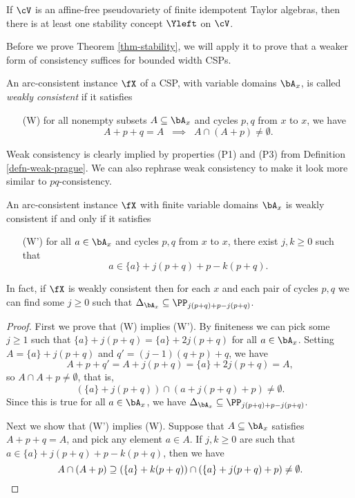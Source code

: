 \begin{thm}\label{thm-stability} If $\cV$ is an affine-free pseudovariety of finite idempotent Taylor algebras, then there is at least one stability concept $\Yleft$ on $\cV$.
\end{thm}

Before we prove Theorem \ref{thm-stability}, we will apply it to prove that a weaker form of consistency suffices for bounded width CSPs.

\begin{defn} An arc-consistent instance $\fX$ of a CSP, with variable domains $\bA_x$, is called \emph{weakly consistent} if it satisfies
\begin{itemize}
\item[(W)] for all nonempty subsets $A \subseteq \bA_x$ and cycles $p,q$ from $x$ to $x$, we have
\[
A + p + q = A \;\; \implies \;\; A \cap (A + p) \ne \emptyset.
\]
\end{itemize}
\end{defn}

Weak consistency is clearly implied by properties (P1) and (P3) from Definition \ref{defn-weak-prague}. We can also rephrase weak consistency to make it look more similar to $pq$-consistency.

\begin{prop}\label{prop-weakly-consistent-cycle} An arc-consistent instance $\fX$ with finite variable domains $\bA_x$ is weakly consistent if and only if it satisfies
\begin{itemize}
\item[(W')] for all $a \in \bA_x$ and cycles $p,q$ from $x$ to $x$, there exist $j,k \ge 0$ such that
\[
a \in \{a\} + j(p+q) + p - k(p+q).
\]
\end{itemize}
In fact, if $\fX$ is weakly consistent then for each $x$ and each pair of cycles $p,q$ we can find some $j \ge 0$ such that $\Delta_{\bA_x} \subseteq \PP_{j(p+q) + p - j(p+q)}$.
\end{prop}
\begin{proof} First we prove that (W) implies (W'). By finiteness we can pick some $j \ge 1$ such that $\{a\} + j(p+q) = \{a\} + 2j(p+q)$ for all $a \in \bA_x$. Setting $A = \{a\} + j(p+q)$ and $q' = (j-1)(q+p) + q$, we have
\[
A + p + q' = A + j(p+q) = \{a\} + 2j(p+q) = A,
\]
so $A \cap A + p \ne \emptyset$, that is,
\[
(\{a\} + j(p+q)) \cap (a + j(p+q) + p) \ne \emptyset.
\]
Since this is true for all $a \in \bA_x$, we have $\Delta_{\bA_x} \subseteq \PP_{j(p+q) + p - j(p+q)}$.

Next we show that (W') implies (W). Suppose that $A \subseteq \bA_x$ satisfies $A + p + q = A$, and pick any element $a \in A$. If $j,k \ge 0$ are such that $a \in \{a\} + j(p+q) + p - k(p+q)$, then we have
\[
A \cap (A + p) \supseteq (\{a\} + k(p+q)) \cap (\{a\} + j(p+q) + p) \ne \emptyset.\qedhere
\]
\end{proof}

